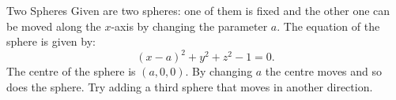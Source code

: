 \begin{surferPage}{Two Spheres}
Given are two spheres: one of them is fixed and the other one can be moved along the $x$-axis by changing the parameter $a$.
The equation of the sphere is given by:
\[(x-a)^2+y^2+z^2-1=0.\]
The centre of the sphere is $(a,0,0)$. By changing $a$ the centre moves and so does the sphere.
Try adding a third sphere that moves in another direction.
\end{surferPage}
